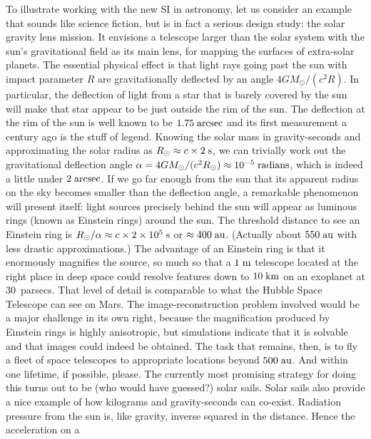 \documentclass[aps,prb,12pt]{revtex4-1}
\def\unit#1{\;{\rm#1}}
\begin{document}
To illustrate working with the new SI in astronomy, let us consider an
example that sounds like science fiction, but is in fact a serious
design study: the solar gravity lens
mission.\cite{2020arXiv200211871T} It envisions a telescope larger
than the solar system with the sun's gravitational field as its main
lens, for mapping the surfaces of extra-solar planets.  The essential
physical effect is that light rays going past the sun with impact
parameter $R$ are gravitationally deflected by an angle
$4GM_\odot/(c^2 R)$.  In particular, the deflection of light from a
star that is barely covered by the sun will make that star appear to
be just outside the rim of the sun.  The deflection at the rim of the
sun is well known to be $1.75\unit{arcsec}$ and its first measurement
a century ago is the stuff of legend.\cite{Kennefick2012} Knowing the
solar mass in gravity-seconds and approximating the solar radius as
$R_\odot\approx c\times2\unit{s}$, we can trivially work out the
gravitational deflection angle $\alpha=4GM_\odot/(c^2 R_\odot)
\approx10^{-5}\unit{radians}$, which is indeed a little under
$2\unit{arcsec}$.  If we go far enough from the sun that its apparent
radius on the sky becomes smaller than the deflection angle, a
remarkable phenomenon will present itself: light sources precisely
behind the sun will appear as luminous rings (known as Einstein rings)
around the sun.  The threshold distance to see an Einstein ring is
$R_\odot/\alpha\approx c\times2\times10^5\unit{s}$ or $\approx
400\unit{au}$.  (Actually about $550\unit{au}$ with less drastic
approximations.)  The advantage of an Einstein ring is that it
enormously magnifies the source, so much so that a $1\unit{m}$
telescope located at the right place in deep space could resolve
features down to $10\unit{km}$ on an exoplanet at 30~parsecs.  That
level of detail is comparable to what the Hubble Space Telescope can
see on Mars.  The image-reconstruction problem involved would be a
major challenge in its own right, because the magnification produced
by Einstein rings is highly anisotropic, but simulations indicate that
it is solvable and that images could indeed be obtained.  The task
that remains, then, is to fly a fleet of space telescopes to
appropriate locations beyond $500\unit{au}$.  And within one lifetime,
if possible, please.  The currently most promising strategy for doing
this turns out to be (who would have guessed?) solar sails.  Solar
sails also provide a nice example of how kilograms and gravity-seconds
can co-exist.  Radiation pressure from the sun is, like gravity,
inverse squared in the distance.  Hence the acceleration on a
\end{document}

